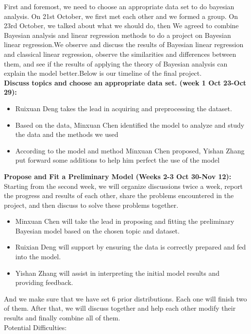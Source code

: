 \documentclass[12pt,a4paper]{article}
\begin{document}
First and foremost, we need to choose an appropriate data set to do bayesian analysis. On 21st October, we first met each other and we formed a group. On 23rd October, we talked about what we should do, then We agreed to combine Bayesian analysis and linear regression methods to do a project on Bayesian linear regression.We observe and discuss the results of Bayesian linear regression and classical linear regression, observe the similarities and differences between them, and see if the results of applying the theory of Bayesian analysis can explain the model better.Below is our timeline of the final project.\\
\textbf{Discuss topics and choose an appropriate data set. (week 1 Oct 23-Oct 29):}
\begin{itemize}
    \item Ruixuan Deng takes the lead in acquiring and preprocessing the dataset.
    \item Based on the data, Minxuan Chen identified the model to analyze and study the data and the methods we used
    \item According to the model and method Minxuan Chen proposed, Yishan Zhang put forward some additions to help him perfect the use of the model
\end{itemize}
\textbf{Propose and Fit a Preliminary Model (Weeks 2-3 Oct 30-Nov 12):}\\
Starting from the second week, we will organize discussions twice a week, report the progress and results of each other, share the problems encountered in the project, and then discuss to solve these problems together.
\begin{itemize}
    \item Minxuan Chen will take the lead in proposing and fitting the preliminary Bayesian model based on the chosen topic and dataset.
    \item Ruixian Deng will support by ensuring the data is correctly prepared and fed into the model.
    \item Yishan Zhang will assist in interpreting the initial model results and providing feedback.
\end{itemize}

And we make sure that we have set 6 prior distributions. Each one will finish two of them. After that, we will discuss together and help each other modify their results and finally combine all of them.\\

Potential Difficulties:
\end{document}
